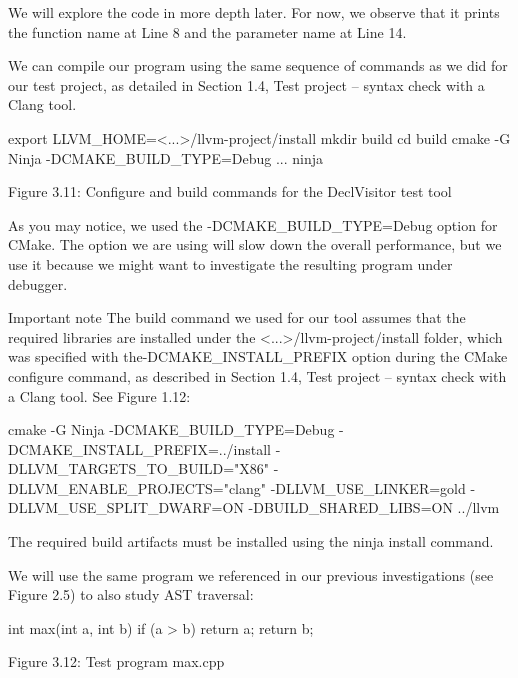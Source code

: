 We will explore the code in more depth later. For now, we observe that it prints the function name at Line 8 and the parameter name at Line 14.

We can compile our program using the same sequence of commands as we did for our test project, as detailed in Section 1.4, Test project – syntax check with a Clang tool.

\begin{shell}
export LLVM_HOME=<...>/llvm-project/install
mkdir build
cd build
cmake -G Ninja -DCMAKE_BUILD_TYPE=Debug ...
ninja
\end{shell}

\begin{center}
Figure 3.11: Configure and build commands for the DeclVisitor test tool
\end{center}

As you may notice, we used the -DCMAKE\_BUILD\_TYPE=Debug option for CMake. The option we are using will slow down the overall performance, but we use it because we might want to investigate the resulting program under debugger.

\begin{myNotic}{Important note}
The build command we used for our tool assumes that the required libraries are installed under the <...>/llvm-project/install folder, which was specified with the-DCMAKE\_INSTALL\_PREFIX option during the CMake configure command, as described in Section 1.4, Test project – syntax check with a Clang tool. See Figure 1.12:

\begin{shell}
cmake -G Ninja -DCMAKE_BUILD_TYPE=Debug -DCMAKE_INSTALL_PREFIX=../install -DLLVM_TARGETS_TO_BUILD="X86" -DLLVM_ENABLE_PROJECTS="clang" -DLLVM_USE_LINKER=gold -DLLVM_USE_SPLIT_DWARF=ON -DBUILD_SHARED_LIBS=ON ../llvm
\end{shell}

The required build artifacts must be installed using the ninja install command.
\end{myNotic}

We will use the same program we referenced in our previous investigations (see Figure 2.5) to also study AST traversal:

\begin{cpp}
int max(int a, int b) {
  if (a > b)
    return a;
  return b;
}
\end{cpp}

\begin{center}
Figure 3.12: Test program max.cpp
\end{center}

